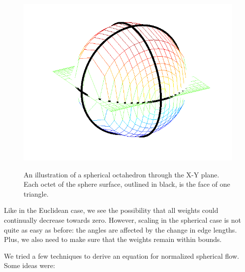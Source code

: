 \documentclass[12pt]{article}
\begin{document}
\begin{figure}
\centering
\includegraphics[scale = 0.6]{Pictures/octosph.png}
\label{OctoSph}
\caption{An illustration of a spherical octahedron through the X-Y plane. Each octet of the sphere surface, outlined in black, is the face of one triangle.} 
\end{figure}

 Like in the Euclidean case, we see the possibility that all weights could continually decrease towards zero. However, scaling in the spherical case is not quite as easy as before: the angles are affected by the change in edge lengths. Plus, we also need to make sure that the weights remain within bounds.

 We tried a few techniques to derive an equation for normalized spherical flow. Some ideas were:
\end{document}
